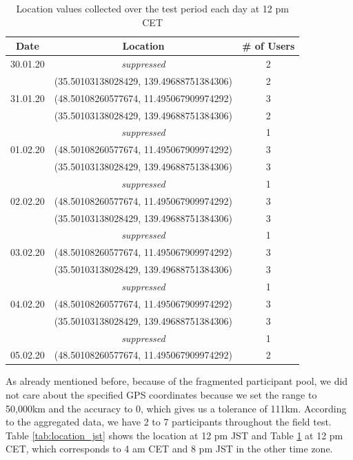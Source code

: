 \begin{table}[htbp]
    \centering
    \begin{tabular}{|c|c|c|} 
        \hline
        \textbf{Date} & \textbf{Location} & \textbf{\# of Users}\\ [0.5ex] 
        \hline
        30.01.20 &\textit{suppressed} & 2 \\ 
        & (35.50103138028429, 139.49688751384306) & 2 \\
        \hline
        31.01.20 & (48.50108260577674, 11.495067909974292) & 3 \\ 
        & (35.50103138028429, 139.49688751384306) & 2 \\
        &\textit{suppressed} & 1 \\
        \hline
        01.02.20 & (48.50108260577674, 11.495067909974292) & 3 \\ 
        & (35.50103138028429, 139.49688751384306) & 3 \\
        &\textit{suppressed} & 1 \\
        \hline
        02.02.20 & (48.50108260577674, 11.495067909974292) & 3 \\ 
        & (35.50103138028429, 139.49688751384306) & 3 \\
        &\textit{suppressed} & 1 \\
        \hline
        03.02.20 & (48.50108260577674, 11.495067909974292) & 3 \\ 
        & (35.50103138028429, 139.49688751384306) & 3 \\
        &\textit{suppressed} & 1 \\
        \hline
        04.02.20 & (48.50108260577674, 11.495067909974292) & 3 \\ 
        & (35.50103138028429, 139.49688751384306) & 3 \\
        &\textit{suppressed} & 1 \\
        \hline
        05.02.20 & (48.50108260577674, 11.495067909974292) & 2 \\ 
        \hline
    \end{tabular}
    \caption{Location values collected over the test period each day at 12 pm CET}
    \label{tab:location_cet}
\end{table}

As already mentioned before, because of the fragmented participant pool, we did not care about the specified GPS coordinates because we set the range to 50,000km and the accuracy to 0, which gives us a tolerance of 111km. According to the aggregated data, we have 2 to 7 participants throughout the field test. Table \ref{tab:location_jst} shows the location at 12 pm JST and Table \ref{tab:location_cet} at 12 pm CET, which corresponds to 4 am CET and 8 pm JST in the other time zone. 

